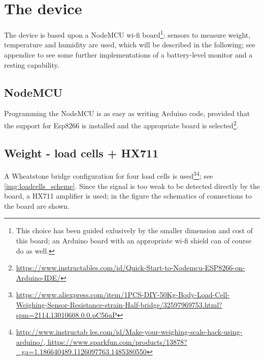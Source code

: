 \section{The device}
The device is based upon a NodeMCU wi-fi board\footnote{This choice has been guided exlusively by the smaller dimension and cost of this board; an Arduino board with an appropriate wi-fi shield can of course do as well.}: sensors to measure weight, temperature and humidity are used, which will be described in the following; see appendice  to see some further implementations of a battery-level monitor and a resting capability.

\subsection{NodeMCU}
Programming the NodeMCU is as easy as writing Arduino code, provided that the support for Esp8266 is installed and the appropriate board is selected\footnote{\url{https://www.instructables.com/id/Quick-Start-to-Nodemcu-ESP8266-on-Arduino-IDE/}}.

\subsection{Weight - load cells + HX711}
A Wheatstone bridge configuration for four load cells is used\footnote{\url{https://www.aliexpress.com/item/1PCS-DIY-50Kg-Body-Load-Cell-Weighing-Sensor-Resistance-strain-Half-bridge/32597969753.html?spm=2114.13010608.0.0.pC56uP}}\footnote{\url{http://www.instructab
les.com/id/Make-your-weighing-scale-hack-using-arduino/, https://www.sparkfun.com/products/13878?_ga=1.186640489.1126097763.1485380550}}; see \autoref{img:loadcells_scheme}. Since the signal is too weak to be detected directly by the board, a HX711 amplifier is used; in the figure the schematics of connections to the board are shown.

